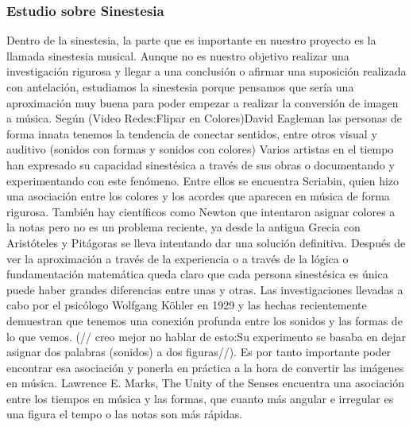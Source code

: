 \subsubsection{Estudio sobre Sinestesia}

Dentro de la sinestesia, la parte que es importante en nuestro proyecto es la llamada sinestesia musical. Aunque no es nuestro objetivo realizar una investigación rigurosa y llegar a una conclusión o afirmar una suposición realizada con antelación, estudiamos la sinestesia porque pensamos que sería una aproximación muy buena para poder empezar a realizar la conversión de imagen a música.
Según (Video Redes:Flipar en Colores)David Eagleman las personas de forma innata  tenemos la tendencia de conectar sentidos, entre otros visual y auditivo (sonidos con formas y sonidos con colores)
Varios artistas en el tiempo han expresado su capacidad sinestésica a través de sus obras o documentando y experimentando con este fenómeno. Entre ellos se encuentra Scriabin, quien hizo una asociación entre los colores y los acordes que aparecen en música de forma rigurosa. También hay científicos como Newton que intentaron asignar colores a la notas pero no es un problema reciente, ya desde la antigua Grecia con Aristóteles y Pitágoras se lleva intentando dar una solución definitiva. Después de ver la aproximación a través de la experiencia o a través de la lógica o fundamentación matemática queda claro que cada persona sinestésica es única puede haber grandes diferencias entre unas y otras.
Las investigaciones llevadas a cabo por el psicólogo Wolfgang Köhler en 1929 y las hechas recientemente demuestran que tenemos una conexión profunda entre los sonidos y las formas de lo que vemos. (// creo mejor no hablar de esto:Su experimento se basaba en dejar asignar dos palabras (sonidos) a dos figuras//). Es por tanto importante poder encontrar esa asociación y ponerla en práctica a la hora de convertir las imágenes en música. Lawrence E. Marks, The Unity of the Senses encuentra una asociación entre los tiempos en música y las formas, que cuanto más angular e irregular es una figura el tempo o las notas son más rápidas.
